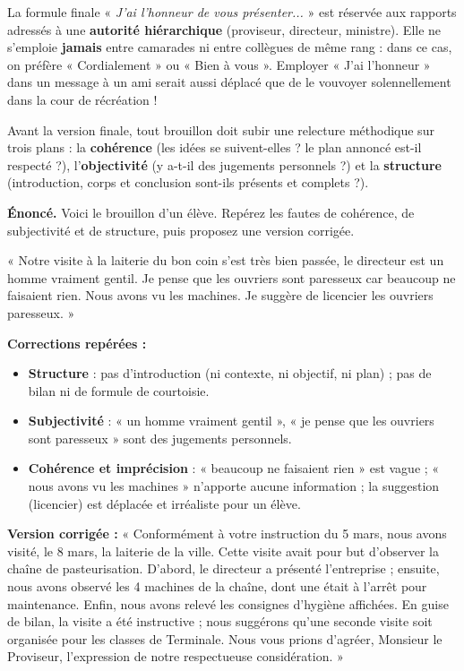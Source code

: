 \documentclass[11pt]{article}
\newcounter{popsec}
\newcounter{popsub}
\newcommand{\courssub}[1]{%
  \stepcounter{popsub}%
  \par\vspace{9pt}\noindent{\popxbold\fontsize{11.5}{13}\selectfont\color{popink}{\color{poporange}\thepopsec.\thepopsub}\hspace{6pt}#1}\par\nopagebreak\vspace{4pt}
}
\begin{document}
\begin{savaistu}
La formule finale « \emph{J'ai l'honneur de vous présenter...} » est réservée aux rapports adressés à une \textbf{autorité hiérarchique} (proviseur, directeur, ministre). Elle ne s'emploie \textbf{jamais} entre camarades ni entre collègues de même rang : dans ce cas, on préfère « Cordialement » ou « Bien à vous ». Employer « J'ai l'honneur » dans un message à un ami serait aussi déplacé que de le vouvoyer solennellement dans la cour de récréation !
\end{savaistu}

\courssub{Correction guidée d'un brouillon}

Avant la version finale, tout brouillon doit subir une relecture méthodique sur trois plans : la \textbf{cohérence} (les idées se suivent-elles ? le plan annoncé est-il respecté ?), l'\textbf{objectivité} (y a-t-il des jugements personnels ?) et la \textbf{structure} (introduction, corps et conclusion sont-ils présents et complets ?).

\begin{exoresolu}
\textbf{Énoncé.} Voici le brouillon d'un élève. Repérez les fautes de cohérence, de subjectivité et de structure, puis proposez une version corrigée.

« Notre visite à la laiterie du bon coin s'est très bien passée, le directeur est un homme vraiment gentil. Je pense que les ouvriers sont paresseux car beaucoup ne faisaient rien. Nous avons vu les machines. Je suggère de licencier les ouvriers paresseux. »

\tcblower
\textbf{Corrections repérées :}
\begin{itemize}
\item \textbf{Structure} : pas d'introduction (ni contexte, ni objectif, ni plan) ; pas de bilan ni de formule de courtoisie.
\item \textbf{Subjectivité} : « un homme vraiment gentil », « je pense que les ouvriers sont paresseux » sont des jugements personnels.
\item \textbf{Cohérence et imprécision} : « beaucoup ne faisaient rien » est vague ; « nous avons vu les machines » n'apporte aucune information ; la suggestion (licencier) est déplacée et irréaliste pour un élève.
\end{itemize}
\textbf{Version corrigée :} « Conformément à votre instruction du 5 mars, nous avons visité, le 8 mars, la laiterie de la ville. Cette visite avait pour but d'observer la chaîne de pasteurisation. D'abord, le directeur a présenté l'entreprise ; ensuite, nous avons observé les 4 machines de la chaîne, dont une était à l'arrêt pour maintenance. Enfin, nous avons relevé les consignes d'hygiène affichées. En guise de bilan, la visite a été instructive ; nous suggérons qu'une seconde visite soit organisée pour les classes de Terminale. Nous vous prions d'agréer, Monsieur le Proviseur, l'expression de notre respectueuse considération. »
\end{exoresolu}
\end{document}
